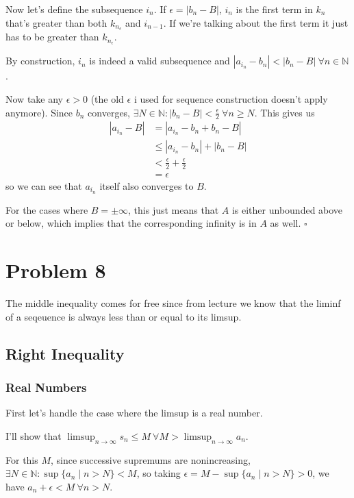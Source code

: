 \documentclass[12pt]{article}
\newcommand{\N}{\mathbb{N}}
\begin{document}
Now let's define the subsequence $i_n$.
If $\epsilon=|b_n - B|$, $i_n$ is the first term in $k_n$
that's greater than both $k_{n_\epsilon}$ and $i_{n-1}$.
If we're talking about the first term it just has to be greater than $k_{n_\epsilon}$.

By construction, $i_n$ is indeed a valid subsequence and $|a_{i_n} - b_n| < |b_n - B|\ \forall n \in \N$.

Now take any $\epsilon > 0$ (the old $\epsilon$ i used for sequence construction doesn't apply anymore).
Since $b_n$ converges, $\exists N \in \N: |b_n-B| < \frac{\epsilon}{2}\ \forall n \ge N$.
This gives us
\begin{align*}
  |a_{i_n}-B|
   & = |a_{i_n} - b_n + b_n - B|               \\
   & \le |a_{i_n} - b_n| + |b_n - B|           \\
   & < \frac{\epsilon}{2} + \frac{\epsilon}{2} \\
   & = \epsilon
\end{align*}
so we can see that $a_{i_n}$ itself also converges to $B$.

For the cases where $B=\pm \infty$, this just means that $A$ is either
unbounded above or below, which implies that the corresponding infinity is in $A$ as well. $\square$

\pagebreak

\section{Problem 8}

The middle inequality comes for free since from lecture we know that the
liminf of a seqeuence is always less than or equal to its limsup.

\subsection{Right Inequality}

\subsubsection{Real Numbers}

First let's handle the case where the limsup is a real number.

I'll show that $\limsup_{n \to \infty} s_n \le M\ \forall M > \limsup_{n \to \infty} a_n$.

For this $M$, since successive supremums are nonincreasing,
$\exists N \in \N: \sup \{a_n \mid n > N\} < M$,
so taking $\epsilon = M - \sup \{a_n \mid n > N\} > 0$, we have $a_n + \epsilon < M\ \forall n > N$.
\end{document}
